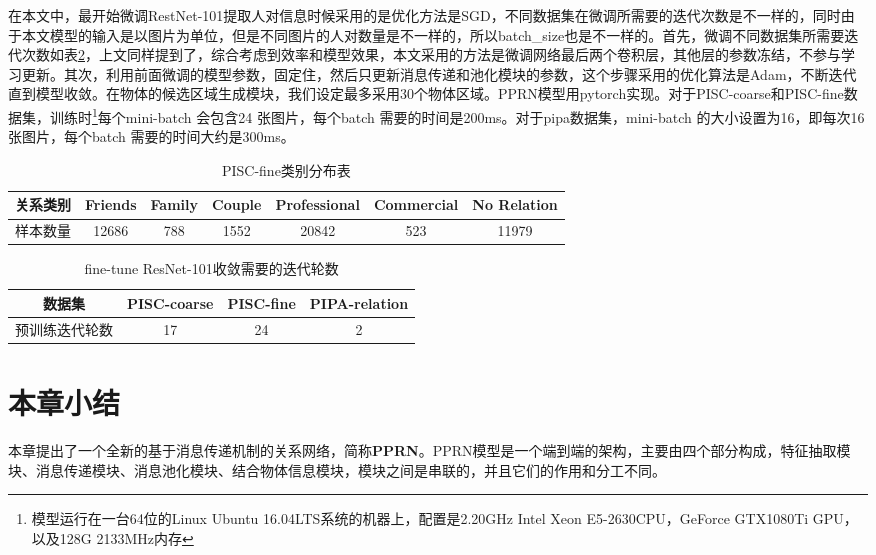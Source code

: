 在本文中，最开始微调RestNet-101提取人对信息时候采用的是优化方法是SGD，不同数据集在微调所需要的迭代次数是不一样的，同时由于本文模型的输入是以图片为单位，但是不同图片的人对数量是不一样的，所以batch\_size也是不一样的。首先，微调不同数据集所需要迭代次数如表\ref{tab:model-ft-epoch}，上文同样提到了，综合考虑到效率和模型效果，本文采用的方法是微调网络最后两个卷积层，其他层的参数冻结，不参与学习更新。其次，利用前面微调的模型参数，固定住，然后只更新消息传递和池化模块的参数，这个步骤采用的优化算法是Adam\cite{kingma2014adam}，不断迭代直到模型收敛。在物体的候选区域生成模块，我们设定最多采用30个物体区域。PPRN模型用pytorch实现。对于PISC-coarse和PISC-fine数据集，训练时\footnote{模型运行在一台64位的Linux Ubuntu 16.04LTS系统的机器上，配置是2.20GHz Intel Xeon E5-2630CPU，GeForce GTX1080Ti GPU，以及128G 2133MHz内存}每个mini-batch 会包含24 张图片，每个batch 需要的时间是200ms。对于pipa数据集，mini-batch 的大小设置为16，即每次16 张图片，每个batch 需要的时间大约是300ms。

\begin{table}[htpb]
  \centering
  \caption{PISC-fine类别分布表}
  \label{tab:model-pisc-cls}
  \begin{tabular}{c|c|c|c|c|c|c}
    \toprule
    关系类别 & Friends & Family & Couple & Professional & Commercial & No Relation \\
    \midrule
    样本数量 & 12686 & 788 & 1552 & 20842 & 523 & 11979 \\
    \bottomrule
  \end{tabular}
\end{table}


\begin{table}[htpb]
  \centering
  \caption{fine-tune ResNet-101收敛需要的迭代轮数}
  \label{tab:model-ft-epoch}
  \begin{tabular}{c|c|c|c}
    \toprule
    数据集 & PISC-coarse & PISC-fine  & PIPA-relation \\
    \midrule
    预训练迭代轮数 & 17 & 24 & 2 \\
    \midrule
    \bottomrule
  \end{tabular}
\end{table}

\section{本章小结}

本章提出了一个全新的基于消息传递机制的关系网络，简称\textbf{PPRN}。PPRN模型是一个端到端的架构，主要由四个部分构成，特征抽取模块、消息传递模块、消息池化模块、结合物体信息模块，模块之间是串联的，并且它们的作用和分工不同。


